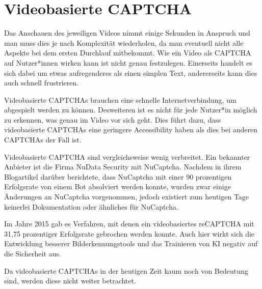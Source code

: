 \section{Videobasierte CAPTCHA}
Das Anschauen des jeweiligen Videos nimmt einige Sekunden in Anspruch und man muss dies je nach Komplexität wiederholen, 
da man eventuell nicht alle Aspekte bei dem ersten Durchlauf mitbekommt.
Wie ein Video als CAPTCHA auf Nutzer*innen wirken kann ist nicht genau festzulegen.
Einerseits handelt es sich dabei um etwas aufregenderes als einen simplen Text, andererseits kann dies auch schnell frustrieren.

Videobasierte CAPTCHAs brauchen eine schnelle Internetverbindung, um abgespielt werden zu können. %
Desweiteren ist es nicht für jede Nutzer*in möglich zu erkennen, was genau im Video vor sich geht.
Dies führt dazu, dass videobasierte CAPTCHAs eine geringere Accessibility haben als dies bei anderen CAPTCHAs der Fall ist. 

Videobasierte CAPTCHA sind vergleichsweise wenig verbreitet. 
Ein bekannter Anbieter ist die Firma NuData Security mit NuCaptcha.
Nachdem \citeauthor{elie} in ihrem Blogartikel  darüber berichtete, 
dass NuCaptcha mit einer 90 prozentigen Erfolgsrate von einem Bot absolviert werden konnte,
wurden zwar einige Änderungen an NuCaptcha vorgenommen, jedoch existiert zum heutigen Tage keinerlei Dokumentation oder ähnliches für NuCaptcha.

Im Jahre 2015 gab es Verfahren, mit denen ein videobasiertes reCAPTCHA mit 31,75 prozentiger Erfolgsrate gebrochen werden konnte. 
Auch hier wirkt sich die Entwicklung besserer Bilderkennungstools und das Trainieren von KI negativ auf die Sicherheit aus.\cite[p.xx]{surveyofresearch}

Da videobasierte CAPTCHAs in der heutigen Zeit kaum noch von Bedeutung sind, werden diese nicht weiter betrachtet.

